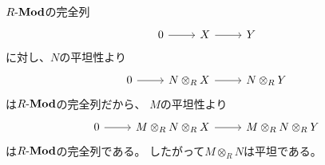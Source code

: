 \documentclass[report]{jlreq}
\begin{document}
\begin{answer}
    $R\text{-}\mathbf{Mod}$の完全列
    \begin{equation}
        \begin{tikzcd}
            0
                \ar{r}
                & X
                    \ar{r}
                & Y
        \end{tikzcd}
    \end{equation}
    に対し、$N$の平坦性より
    \begin{equation}
        \begin{tikzcd}
            0
                \ar{r}
                & N \otimes_R X
                    \ar{r}
                & N \otimes_R Y
        \end{tikzcd}
    \end{equation}
    は$R\text{-}\mathbf{Mod}$の完全列だから、
    $M$の平坦性より
    \begin{equation}
        \begin{tikzcd}
            0
                \ar{r}
                & M \otimes_R N \otimes_R X
                    \ar{r}
                & M \otimes_R N \otimes_R Y
        \end{tikzcd}
    \end{equation}
    は$R\text{-}\mathbf{Mod}$の完全列である。
    したがって$M \otimes_R N$は平坦である。
\end{answer}
\end{document}
